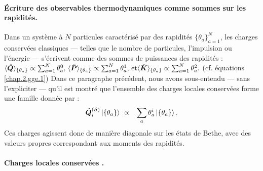 \paragraph{Écriture des observables thermodynamiques comme sommes sur les rapidités.}

Dans un système à $N$ particules caractérisé par des rapidités $\{ \theta_a \}_{a = 1}^N$, les charges conservées classiques — telles que le nombre de particules, l’impulsion ou l’énergie — s’écrivent comme des sommes de puissances des rapidités :
\(
	\langle \hat{\bm{Q}} \rangle_{\{ \theta_a\} } \propto \sum_{a = 1}^N \theta_a^0 , \,  \langle \hat{\bm{P}} \rangle_{\{ \theta_a\} } \propto \sum_{a = 1}^N \theta_a^1  ,\,  \mbox{et} \langle \hat{\bm{K}} \rangle_{\{ \theta_a\} } \propto \sum_{a = 1}^N \theta_a^2 .	
\)
(cf. équations \eqref{chap.2.gge.1})
Dans ce paragraphe précédent, nous avons sous-entendu — sans l’expliciter — qu’il est montré que l’ensemble des charges locales conservées forme une famille donnée par :
\begin{eqnarray}
	\operator{Q}_i^{(\mathcal{S})} \ket{\{\theta_a\} } & \propto & \sum_a \theta_a^i \ket{\{\theta_a\} }.
\end{eqnarray}
Ces charges agissent donc de manière diagonale sur les états de Bethe, avec des valeurs propres correspondant aux moments des rapidités.
\paragraph{Charges locales conservées .\label{sec:charges-gen}}


